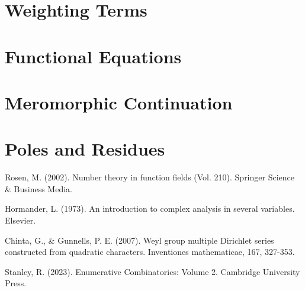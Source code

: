 \documentclass[12pt,reqno,oneside]{amsart}
\begin{document}
\section*{Weighting Terms}
\section*{Functional Equations}
\section*{Meromorphic Continuation}
\section*{Poles and Residues}

\begin{thebibliography}{99}
    Rosen, M. (2002). Number theory in function fields (Vol. 210). Springer Science \& Business Media.

    Hormander, L. (1973). An introduction to complex analysis in several variables. Elsevier.

    Chinta, G., \& Gunnells, P. E. (2007). Weyl group multiple Dirichlet series constructed from quadratic characters. Inventiones mathematicae, 167, 327-353.

    Stanley, R. (2023). Enumerative Combinatorics: Volume 2. Cambridge University Press.
\end{thebibliography}
\end{document}
